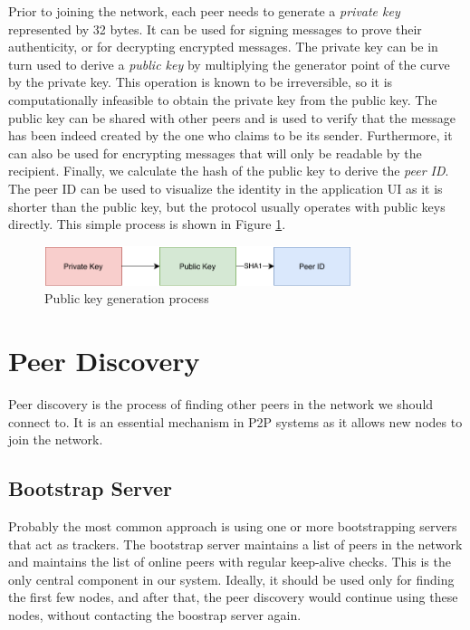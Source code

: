 Prior to joining the network, each peer needs to generate a \textit{private key} represented by 32 bytes. It can be used for signing messages to prove their authenticity, or for decrypting encrypted messages. The private key can be in turn used to derive a \textit{public key} by multiplying the generator point of the curve by the private key. This operation is known to be irreversible, so it is computationally infeasible to obtain the private key from the public key. The public key can be shared with other peers and is used to verify that the message has been indeed created by the one who claims to be its sender. Furthermore, it can also be used for encrypting messages that will only be readable by the recipient. Finally, we calculate the hash of the public key to derive the \textit{peer ID}. The peer ID can be used to visualize the identity in the application UI as it is shorter than the public key, but the protocol usually operates with public keys directly. This simple process is shown in Figure \ref{keys}.

\begin{figure}[h!]
    \centering
    \includegraphics[width=0.8\textwidth]{diagrams/keys}
    \caption{Public key generation process}
    \label{keys}
\end{figure}

\section{Peer Discovery}

Peer discovery is the process of finding other peers in the network we should connect to. It is an essential mechanism in P2P systems as it allows new nodes to join the network.

\subsection{Bootstrap Server}

Probably the most common approach is using one or more bootstrapping servers that act as trackers. The bootstrap server maintains a list of peers in the network and maintains the list of online peers with regular keep-alive checks. This is the only central component in our system. Ideally, it should be used only for finding the first few nodes, and after that, the peer discovery would continue using these nodes, without contacting the boostrap server again.


